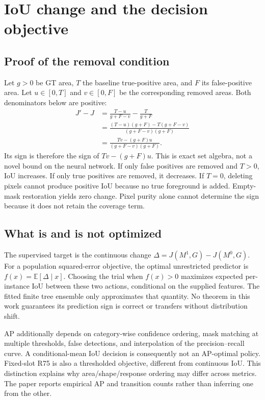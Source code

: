 \documentclass[11pt,a4paper]{article}
\begin{document}
\section{IoU change and the decision objective}
\subsection{Proof of the removal condition}
Let $g>0$ be GT area, $T$ the baseline true-positive area, and $F$ its false-positive area. Let $u\in[0,T]$ and $v\in[0,F]$ be the corresponding removed areas. Both denominators below are positive:
\begin{align}
 J'-J
 &=\frac{T-u}{g+F-v}-\frac{T}{g+F}\\
 &=\frac{(T-u)(g+F)-T(g+F-v)}{(g+F-v)(g+F)}\\
 &=\frac{Tv-(g+F)u}{(g+F-v)(g+F)}.
\end{align}
Its sign is therefore the sign of $Tv-(g+F)u$. This is exact set algebra, not a novel bound on the neural network. If only false positives are removed and $T>0$, IoU increases. If only true positives are removed, it decreases. If $T=0$, deleting pixels cannot produce positive IoU because no true foreground is added. Empty-mask restoration yields zero change. Pixel purity alone cannot determine the sign because it does not retain the coverage term.

\subsection{What is and is not optimized}
The supervised target is the continuous change $\Delta=J(M^1,G)-J(M^0,G)$. For a population squared-error objective, the optimal unrestricted predictor is $f(x)=\mathbb{E}[\Delta\mid x]$. Choosing the trial when $f(x)>0$ maximizes expected per-instance IoU between these two actions, conditional on the supplied features. The fitted finite tree ensemble only approximates that quantity. No theorem in this work guarantees its prediction sign is correct or transfers without distribution shift.

AP additionally depends on category-wise confidence ordering, mask matching at multiple thresholds, false detections, and interpolation of the precision--recall curve. A conditional-mean IoU decision is consequently not an AP-optimal policy. Fixed-slot R75 is also a thresholded objective, different from continuous IoU. This distinction explains why area/shape/response ordering may differ across metrics. The paper reports empirical AP and transition counts rather than inferring one from the other.
\end{document}
